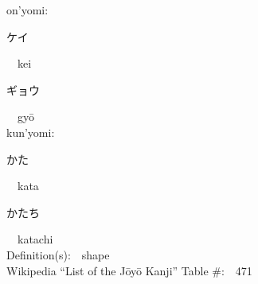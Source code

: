 \begin{multicols}{2}
{\hspace*{1em}}on'yomi:\ \ \\
{\hspace*{2em}}{\begin{CJK}{UTF8}{min} ケイ \end{CJK}}\ \ kei\ \ \\
{\hspace*{2em}}{\begin{CJK}{UTF8}{min} ギョウ \end{CJK}}\ \ gy\=o\ \ \\
{\hspace*{1em}}kun'yomi:\ \ \\
{\hspace*{2em}}{\begin{CJK}{UTF8}{min} かた \end{CJK}}\ \ kata\ \ \\
{\hspace*{2em}}{\begin{CJK}{UTF8}{min} かたち \end{CJK}}\ \ katachi\ \ \\
Definition(s):\ \ shape \\
Wikipedia ``List of the J\=oy\=o Kanji'' Table \#:\ \ 471 \\
\ \ \\
\end{multicols}



